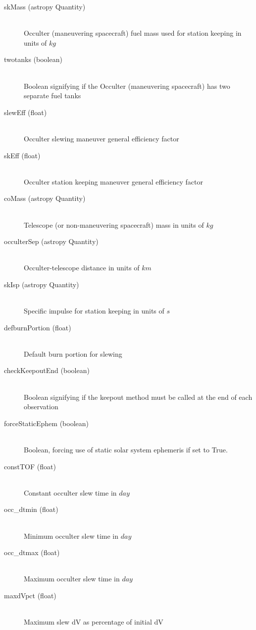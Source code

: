 \documentclass[cleanfoot]{asme2ej}
\begin{document}
\begin{itemize}
\begin{description}
    \item[skMass (astropy Quantity)] \hfill \\ Occulter (maneuvering spacecraft) fuel mass used for station keeping in units of $ kg $
    \item[twotanks (boolean)] \hfill \\ Boolean signifying if the Occulter (maneuvering spacecraft) has two separate fuel tanks
    \item[slewEff (float)] \hfill \\ Occulter slewing maneuver general efficiency factor
    \item[skEff (float)] \hfill \\ Occulter station keeping maneuver general efficiency factor
    \item[coMass (astropy Quantity)] \hfill \\ Telescope (or non-maneuvering spacecraft) mass in units of $ kg $
    \item[occulterSep (astropy Quantity)] \hfill \\ Occulter-telescope distance in units of $ km $
    \item[skIsp (astropy Quantity)] \hfill \\ Specific impulse for station keeping in units of $ s $
    \item[defburnPortion (float)] \hfill \\ Default burn portion for slewing
    \item[checkKeepoutEnd (boolean)] \hfill \\ Boolean signifying if the keepout method must be called at the end of each observation
    \item[forceStaticEphem (boolean)] \hfill \\ Boolean, forcing use of static solar system ephemeris if set to True.
    \item[constTOF (float)] \hfill \\ Constant occulter slew time in $ day $
    \item[occ\_dtmin (float)] \hfill \\ Minimum occulter slew time in $ day $
    \item[occ\_dtmax (float)] \hfill \\ Maximum occulter slew time in $ day $
    \item[maxdVpct (float)] \hfill \\ Maximum slew dV as percentage of initial dV

\end{description}
\end{itemize}
\end{document}
